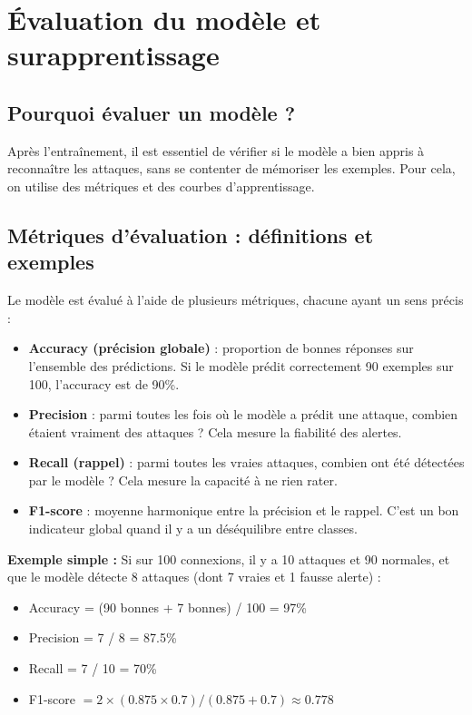 \documentclass[a4paper,12pt]{article}
\begin{document}
\section{Évaluation du modèle et surapprentissage}

\subsection{Pourquoi évaluer un modèle ?}
Après l'entraînement, il est essentiel de vérifier si le modèle a bien appris à reconnaître les attaques, sans se contenter de mémoriser les exemples. Pour cela, on utilise des métriques et des courbes d'apprentissage.

\subsection{Métriques d'évaluation : définitions et exemples}
Le modèle est évalué à l'aide de plusieurs métriques, chacune ayant un sens précis :
\begin{itemize}
  \item \textbf{Accuracy (précision globale)} : proportion de bonnes réponses sur l'ensemble des prédictions. Si le modèle prédit correctement 90 exemples sur 100, l'accuracy est de 90\%.
  \item \textbf{Precision} : parmi toutes les fois où le modèle a prédit une attaque, combien étaient vraiment des attaques ? Cela mesure la fiabilité des alertes.
  \item \textbf{Recall (rappel)} : parmi toutes les vraies attaques, combien ont été détectées par le modèle ? Cela mesure la capacité à ne rien rater.
  \item \textbf{F1-score} : moyenne harmonique entre la précision et le rappel. C'est un bon indicateur global quand il y a un déséquilibre entre classes.
\end{itemize}

\textbf{Exemple simple :}
Si sur 100 connexions, il y a 10 attaques et 90 normales, et que le modèle détecte 8 attaques (dont 7 vraies et 1 fausse alerte) :
\begin{itemize}
  \item Accuracy = (90 bonnes + 7 bonnes) / 100 = 97\%
  \item Precision = 7 / 8 = 87.5\%
  \item Recall = 7 / 10 = 70\%
  \item F1-score $= 2 \times (0.875 \times 0.7) / (0.875 + 0.7) \approx 0.778$
\end{itemize}
\end{document}
